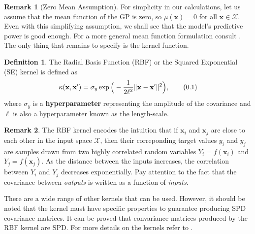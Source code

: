 \documentclass[10pt]{article}
\theoremstyle{definition}
\newtheorem{defn}{Definition}[section]
\newtheorem*{rem}{Remark}
\newcommand\eqnum{\addtocounter{equation}{1}\tag{\arabic{section}.\arabic{equation}}}
\begin{document}
\begin{rem}[Zero Mean Assumption]
For simplicity in our calculations, let us assume that the mean function of the GP is zero, so $\mu(\mathbf{x})=0$ for all $\mathbf{x}\in\mathcal{X}$. Even with this simplifying assumption, we shall see that the model's predictive power is good enough. For a more general mean function formulation consult \cite[Section 2.7]{Rasmussen2006}. The only thing that remains to specify is the kernel function.
\end{rem}
\begin{defn}
The Radial Basis Function (RBF) or the Squared Exponential (SE) kernel is defined as
\begin{equation*}
\kappa(\mathbf{x},\mathbf{x}') = \sigma_y \exp \Big(-\frac{1}{2\ell^2} \lVert\mathbf{x}-\mathbf{x}'\rVert^2\Big),
\eqnum
\label{eq:RBF}
\end{equation*}
where $\sigma_y$ is a \textbf{hyperparameter} representing the amplitude of the covariance and $\ell$ is also a hyperparameter known as the length-scale.
\end{defn}
\begin{rem}
The RBF kernel encodes the intuition that if $\mathbf{x}_i$ and $\mathbf{x}_j$ are close to each other in the input space $\mathcal{X}$, then their correponding target values $y_i$ and $y_j$ are samples drawn from two highly correlated random variables $Y_i=f(\mathbf{x}_i)$ and $Y_j=f(\mathbf{x}_j)$. As the distance between the inputs increases, the correlation between $Y_i$ and $Y_j$ decreases exponentially. Pay attention to the fact that the covariance between \textit{outputs} is written as a function of \textit{inputs}.
\end{rem}
There are a wide range of other kernels that can be used. However, it should be noted that the kernel must have specific properties to guarantee producing SPD covariance matrices. It can be proved that convariance matrices produced by the RBF kernel are SPD. For more details on the kernels refer to \cite[Chapter 4]{Rasmussen2006}.
\end{document}
